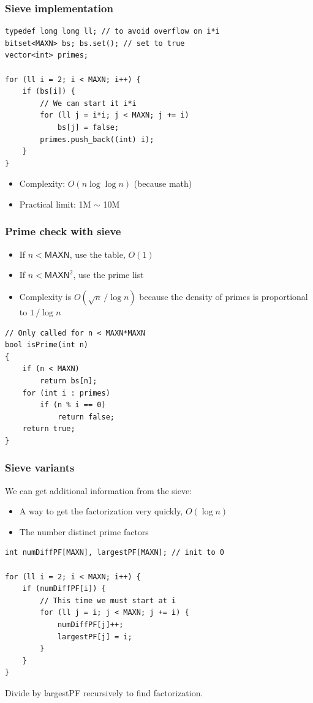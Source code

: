\documentclass[12pt]{beamer}
\begin{document}
\begin{frame}[fragile]
\frametitle{Sieve implementation}
\begin{lstlisting}
typedef long long ll; // to avoid overflow on i*i
bitset<MAXN> bs; bs.set(); // set to true
vector<int> primes;

for (ll i = 2; i < MAXN; i++) {
    if (bs[i]) {
        // We can start it i*i
        for (ll j = i*i; j < MAXN; j += i)
            bs[j] = false;
        primes.push_back((int) i);
    }
}
\end{lstlisting}
\begin{itemize}
\item Complexity: $O(n \log \log n)$ (because math)
\item Practical limit: 1M $\sim$ 10M
\end{itemize}
\end{frame}

\begin{frame}[fragile]
\frametitle{Prime check with sieve}
\begin{itemize}
\item If $n < \mathsf{MAXN}$, use the table, $O(1)$
\item If $n < \mathsf{MAXN}^2$, use the prime list
\item Complexity is $O(\sqrt{n}\,/\log n)$ because the density of primes is proportional to $1\,/ \log n$
\end{itemize}
\begin{lstlisting}
// Only called for n < MAXN*MAXN
bool isPrime(int n)
{
    if (n < MAXN)
        return bs[n];
    for (int i : primes)
        if (n % i == 0)
            return false;
    return true;
}
\end{lstlisting}
\end{frame}

\begin{frame}[fragile]
\frametitle{Sieve variants}
We can get additional information from the sieve:
\begin{itemize}
\item A way to get the factorization very quickly, $O(\log n)$
\item The number distinct prime factors
\end{itemize}
\begin{lstlisting}
int numDiffPF[MAXN], largestPF[MAXN]; // init to 0

for (ll i = 2; i < MAXN; i++) {
    if (numDiffPF[i]) {
        // This time we must start at i
        for (ll j = i; j < MAXN; j += i) {
            numDiffPF[j]++;
            largestPF[j] = i;
        }
    }
}
\end{lstlisting}
Divide by largestPF recursively to find factorization.
\end{frame}
\end{document}
